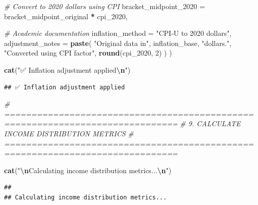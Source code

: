 \documentclass[
]{article}
\newenvironment{Shaded}{\begin{snugshade}}{\end{snugshade}}
\newcommand{\AttributeTok}[1]{\textcolor[rgb]{0.13,0.29,0.53}{#1}}
\newcommand{\CommentTok}[1]{\textcolor[rgb]{0.56,0.35,0.01}{\textit{#1}}}
\newcommand{\DecValTok}[1]{\textcolor[rgb]{0.00,0.00,0.81}{#1}}
\newcommand{\FunctionTok}[1]{\textcolor[rgb]{0.13,0.29,0.53}{\textbf{#1}}}
\newcommand{\NormalTok}[1]{#1}
\newcommand{\SpecialCharTok}[1]{\textcolor[rgb]{0.81,0.36,0.00}{\textbf{#1}}}
\newcommand{\StringTok}[1]{\textcolor[rgb]{0.31,0.60,0.02}{#1}}
\begin{document}
\begin{Shaded}
\begin{Highlighting}[]
    \CommentTok{\# Convert to 2020 dollars using CPI}
    \AttributeTok{bracket\_midpoint\_2020 =}\NormalTok{ bracket\_midpoint\_original }\SpecialCharTok{*}\NormalTok{ cpi\_2020,}
    
    \CommentTok{\# Academic documentation}
    \AttributeTok{inflation\_method =} \StringTok{"CPI{-}U to 2020 dollars"}\NormalTok{,}
    \AttributeTok{adjustment\_notes =} \FunctionTok{paste}\NormalTok{(}
      \StringTok{"Original data in"}\NormalTok{, inflation\_base, }\StringTok{"dollars."}\NormalTok{,}
      \StringTok{"Converted using CPI factor"}\NormalTok{, }\FunctionTok{round}\NormalTok{(cpi\_2020, }\DecValTok{2}\NormalTok{)}
\NormalTok{    )}
\NormalTok{  )}

\FunctionTok{cat}\NormalTok{(}\StringTok{"✅ Inflation adjustment applied}\SpecialCharTok{\textbackslash{}n}\StringTok{"}\NormalTok{)}
\end{Highlighting}
\end{Shaded}

\begin{verbatim}
## ✅ Inflation adjustment applied
\end{verbatim}

\begin{Shaded}
\begin{Highlighting}[]
\CommentTok{\# ==============================================================================}
\CommentTok{\# 9. CALCULATE INCOME DISTRIBUTION METRICS}
\CommentTok{\# ==============================================================================}

\FunctionTok{cat}\NormalTok{(}\StringTok{"}\SpecialCharTok{\textbackslash{}n}\StringTok{Calculating income distribution metrics...}\SpecialCharTok{\textbackslash{}n}\StringTok{"}\NormalTok{)}
\end{Highlighting}
\end{Shaded}

\begin{verbatim}
## 
## Calculating income distribution metrics...
\end{verbatim}
\end{document}
